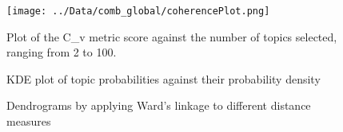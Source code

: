 \renewcommand\thefigure{\thesection.\arabic{figure}}  
\setcounter{figure}{0}
\begin{figure}[!htbp]
    \centering
    \texttt{[image: ../Data/comb\_global/coherencePlot.png]}
    \small
    \caption{Plot of the C\_v metric score against the number of topics selected, ranging from 2 to 100.}
    \label{fig:cv plot}
\end{figure}

\begin{figure}[!htbp]
    \centering
    
    \small
    \caption{KDE plot of topic probabilities against their probability density}
    \label{fig:kde plot}
\end{figure}

\begin{figure}[!htbp]
    \centering
    
    \small
    \caption{Dendrograms by applying Ward's linkage to different distance measures}
    \label{fig:dendrograms}
\end{figure}